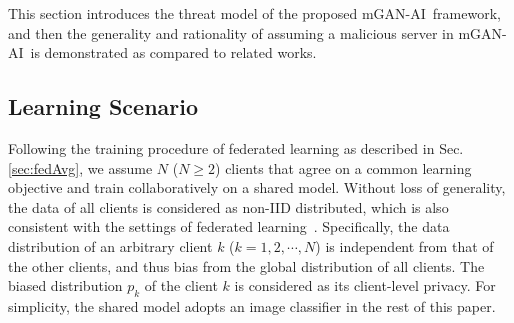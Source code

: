 \documentclass[10pt, conference, letterpaper]{IEEEtran}
\newcommand{\alg}{mGAN-AI}
\begin{document}
This section introduces the threat model of the proposed \alg~framework, and then the generality and rationality of assuming a malicious server in \alg~is demonstrated as compared to related works.

\subsection{Learning Scenario}
Following the training procedure of federated learning as described in Sec. \ref{sec:fedAvg}, we assume $N$ ($N \ge 2$) clients that agree on a common learning objective and train collaboratively on a shared model.
Without loss of generality, the data of all clients is considered as non-IID distributed, which is also consistent with the settings of federated learning~\cite{mcmahan2016communication}. Specifically, the data distribution of an arbitrary client $k$ ($k=1,2,\cdots,N$) is independent from that of the other clients, and thus bias from the global distribution of all clients. The biased distribution $p_k$ of the client $k$ is considered as its client-level privacy.
For simplicity, the shared model adopts an image classifier in the rest of this paper.
\end{document}
